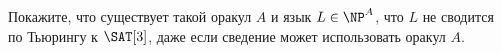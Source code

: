 Покажите, что существует такой оракул $A$ и язык $L \in \NP^A$, что $L$ не сводится по Тьюрингу к
$\SAT[3]$, даже если сведение может использовать оракул $A$.
